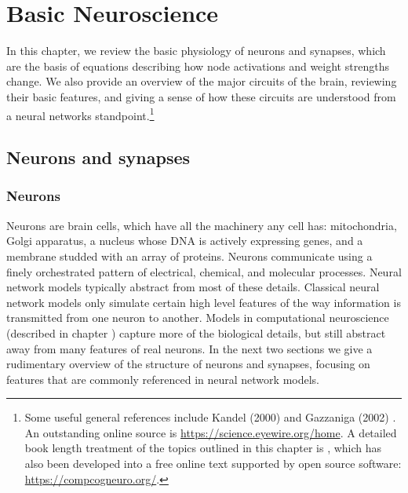 \chapter{Basic Neuroscience}\label{ch_neuro}



In this chapter, we review the basic physiology of neurons and synapses, which are the basis of equations describing how node activations and weight strengths change. We also provide an overview of the major circuits of the brain, reviewing their basic features, and giving a sense of how these circuits are understood from a neural networks standpoint.\footnote{Some useful general references include Kandel (2000) \cite{kandel2000principles} and Gazzaniga (2002) \cite{gazzaniga2002cognitive}. An outstanding online source is \url{https://science.eyewire.org/home}. A detailed book length treatment of the topics outlined in this chapter is \cite{cecn_4e}, which has also been developed into a free online text supported by open source software: \url{https://compcogneuro.org/}.}  

\section{Neurons and synapses}\label{neuronsSynapses}

\subsection{Neurons}

Neurons are brain cells, which have all the machinery any cell has: mitochondria, Golgi apparatus, a nucleus whose DNA is actively expressing genes, and a membrane studded with an array of proteins. Neurons communicate using a finely orchestrated pattern of electrical, chemical, and molecular processes. Neural network models typically abstract from most of these details. Classical neural network models only simulate certain high level features of the way information is transmitted from one neuron to another. Models in computational neuroscience (described in chapter ) capture more of the biological details, but still abstract away from many features of real neurons. In the next two sections we give a rudimentary overview of the structure of neurons and synapses, focusing on features that are commonly referenced in neural network models.

